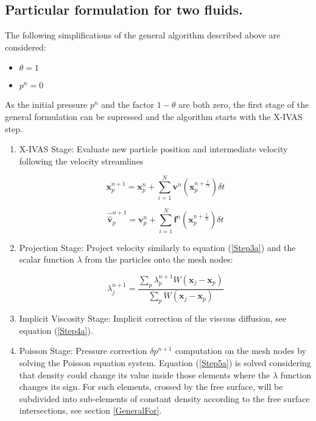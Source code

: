 \subsection{Particular formulation for two fluids.}
The following simplifications of the general algorithm described above are considered:

\begin{itemize}
  \item $\theta=1$
  \item $p^n=0$
\end{itemize}

As the initial pressure $p^n$ and the factor $1-\theta$ are both zero, the first stage of the general formulation can be supressed and the algorithm starts with the X-IVAS step.

\begin{enumerate}

\item X-IVAS Stage: Evaluate new particle position and intermediate velocity following the velocity streamlines

 \begin{equation}\label{Step2astep2fluids}
\mathbf{x}^{n+1}_{p}=\mathbf{x}^{n}_{p} + \sum_{i=1}^{N} \mathbf{v}^{n}(\mathbf{x}^{n+\frac{i}{N}}_{p}) \delta t
\end{equation}

\begin{equation}\label{Step2bstep2fluids}
\widehat{\widehat{\mathbf{v}}}^{n+1}_{p}=\mathbf{v}^{n}_{p} + \sum_{i=1}^{N} \mathbf{f}^{n} (\mathbf{x}^{n+\frac{i}{N}}_{p})  \delta t
\end{equation}

\item Projection Stage: Project velocity similarly to equation (\ref{Step3a}) and the scalar function $\lambda$ from the particles onto the mesh nodes:

\begin{equation}\label{Step3b}
\displaystyle \lambda^{n+1}_{j}=\frac{\sum_{p} \lambda^{n+1}_{p} W(\mathbf{x}_{j}-\mathbf{x}_{p})}{\sum_{p} W(\mathbf{x}_{j}-\mathbf{x}_{p})}
\end{equation}

\item Implicit Viscosity Stage: Implicit correction of the viscous diffusion, see equation (\ref{Step4a}).

\item Poisson Stage: Pressure correction $\delta p^{n+1}$ computation on the mesh nodes by solving the Poisson equation system. Equation (\ref{Step5a}) is solved considering that density could change its value inside those elements where the $\lambda$ function changes its sign. For such elements, crossed by the free surface, will be subdivided into sub-elements of constant density according to the free surface intersections, see section \ref{GeneralFor}.


\end{enumerate}
